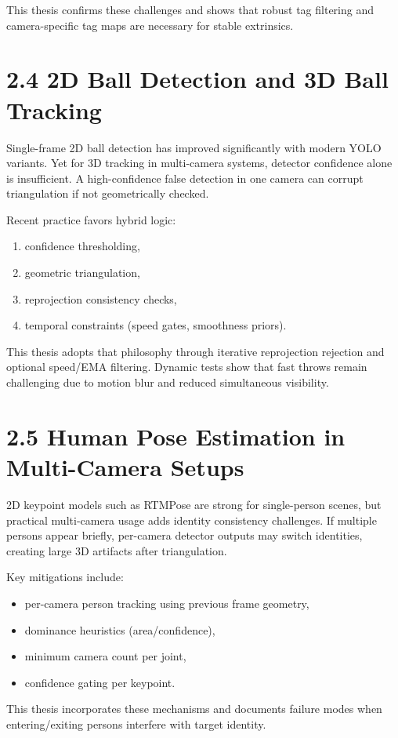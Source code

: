 This thesis confirms these challenges and shows that robust tag filtering and camera-specific tag maps are necessary for stable extrinsics.

\section{2.4 2D Ball Detection and 3D Ball Tracking}
Single-frame 2D ball detection has improved significantly with modern YOLO variants. Yet for 3D tracking in multi-camera systems, detector confidence alone is insufficient. A high-confidence false detection in one camera can corrupt triangulation if not geometrically checked.

Recent practice favors hybrid logic:
\begin{enumerate}
  \item confidence thresholding,
  \item geometric triangulation,
  \item reprojection consistency checks,
  \item temporal constraints (speed gates, smoothness priors).
\end{enumerate}

This thesis adopts that philosophy through iterative reprojection rejection and optional speed/EMA filtering. Dynamic tests show that fast throws remain challenging due to motion blur and reduced simultaneous visibility.

\section{2.5 Human Pose Estimation in Multi-Camera Setups}
2D keypoint models such as RTMPose are strong for single-person scenes, but practical multi-camera usage adds identity consistency challenges. If multiple persons appear briefly, per-camera detector outputs may switch identities, creating large 3D artifacts after triangulation.

Key mitigations include:
\begin{itemize}
  \item per-camera person tracking using previous frame geometry,
  \item dominance heuristics (area/confidence),
  \item minimum camera count per joint,
  \item confidence gating per keypoint.
\end{itemize}

This thesis incorporates these mechanisms and documents failure modes when entering/exiting persons interfere with target identity.

